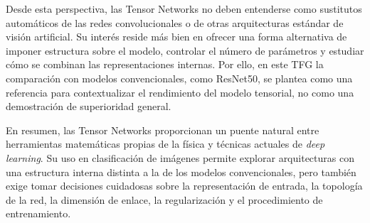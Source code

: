 Desde esta perspectiva, las Tensor Networks no deben entenderse como sustitutos automáticos de las redes convolucionales o de otras arquitecturas estándar de visión artificial. Su interés reside más bien en ofrecer una forma alternativa de imponer estructura sobre el modelo, controlar el número de parámetros y estudiar cómo se combinan las representaciones internas. Por ello, en este TFG la comparación con modelos convencionales, como ResNet50, se plantea como una referencia para contextualizar el rendimiento del modelo tensorial, no como una demostración de superioridad general.

En resumen, las Tensor Networks proporcionan un puente natural entre herramientas matemáticas propias de la física y técnicas actuales de \textit{deep learning}. Su uso en clasificación de imágenes permite explorar arquitecturas con una estructura interna distinta a la de los modelos convencionales, pero también exige tomar decisiones cuidadosas sobre la representación de entrada, la topología de la red, la dimensión de enlace, la regularización y el procedimiento de entrenamiento.